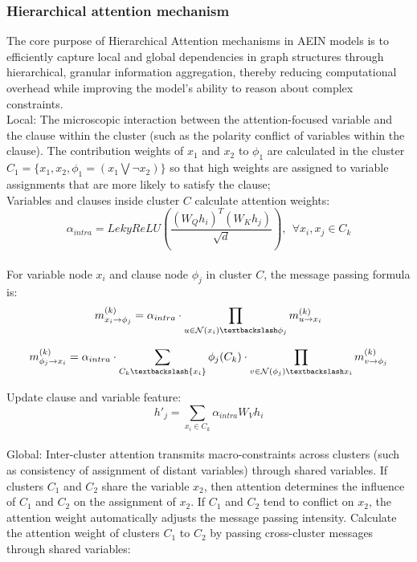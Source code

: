 \subsubsection{Hierarchical attention mechanism}
The core purpose of Hierarchical Attention mechanisms in AEIN models is to efficiently capture local and 
global dependencies in graph structures through hierarchical, granular information aggregation, thereby 
reducing computational overhead while improving the model's ability to reason about complex constraints.\\

Local: The microscopic interaction between the attention-focused variable and the clause within the cluster 
(such as the polarity conflict of variables within the clause).
The contribution weights of \(x_1\) and \(x_2\) to \(\phi_1\) are calculated in the cluster 
\(C_1=\{x_1,x_2,\phi_1=(x_1\bigvee ¬x_2)\}\) so that high weights are assigned to variable assignments 
that are more likely to satisfy the clause;\\

Variables and clauses inside cluster \(C\) calculate attention weights:\\

\begin{equation}
\alpha_{intra}=LekyReLU(\frac{(W_Qh_i)^T(W_Kh_j)}{\sqrt{d}}),\ \ \forall x_i,x_j\in C_k
\end{equation}\\
For variable node \(x_i\) and clause node \(\phi_j\) in cluster \(C\), the message passing formula is:
\begin{equation}
    m_{x_i\rightarrow \phi_j}^{(k)}=\alpha_{intra}\cdot \prod_{u\in \mathcal N(x_i)\textbackslash \phi_j}
    m_{u\rightarrow x_i}^{(k)}
\end{equation}

\begin{equation}
     m_{\phi_j\rightarrow x_i}^{(k)}=\alpha_{intra}\cdot\sum_{C_k \textbackslash \{x_i\}}
     \phi_j(C_k)\cdot\prod_{v\in \mathcal{N}(\phi_j)\textbackslash x_i}m_{v\rightarrow \phi_j}^{(k)}
\end{equation}

Update clause and variable feature:\\

\begin{equation}
h'_j=\sum_{x_i\in C_k}\alpha_{intra}W_Vh_i
\end{equation}\\

Global: Inter-cluster attention transmits macro-constraints across clusters (such as consistency of 
assignment of distant variables) through shared variables.
If clusters \(C_1\) and \(C_2\) share the variable \(x_2\), then attention determines the influence 
of \(C_1\) and \(C_2\) on the assignment of \(x_2\). If \(C_1\) and \(C_2\) tend to conflict on \(x_2\), 
the attention weight automatically adjusts the message passing intensity.
Calculate the attention weight of clusters \(C_1\)  to \(C_2\)  by passing cross-cluster messages 
through shared variables:

